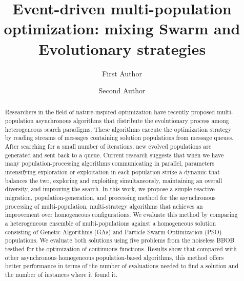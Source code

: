 \documentclass[runningheads]{llncs}
\begin{document}
\title{Event-driven multi-population optimization: mixing Swarm and
  Evolutionary strategies}
\author{First Author \and
Second Author}
%

%
\maketitle              %
%
\begin{abstract}

Researchers in the field of nature-inspired optimization have recently
proposed multi-population asynchronous algorithms that distribute the
evolutionary process among heterogeneous search paradigms. These
algorithms execute the optimization strategy by reading streams of
messages containing solution populations from message queues. After
searching for a small number of iterations, new evolved populations
are generated and sent back to a queue. Current research suggests that
when we have many population-processing algorithms communicating in
parallel, parameters intensifying exploration or exploitation in each
population strike a dynamic that balances the two, exploring and
exploiting simultaneously, maintaining an overall diversity, and
improving the search.  In this work, we propose a simple reactive
migration, population-generation, and processing method for
the asynchronous processing of multi-population, multi-strategy
algorithms that achieves an improvement over homogeneous
configurations. We evaluate this method by comparing a heterogeneous
ensemble of multi-populations against a homogeneous solution
consisting of Genetic Algorithms (GAs) and Particle Swarm Optimization
(PSO) populations. We evaluate both solutions using five problems from
the noiseless BBOB testbed for the optimization of continuous
functions. Results show that compared with other asynchronous
homogeneous population-based algorithms, this method offers better
performance in terms of the number of evaluations needed to find a
solution and the number of instances where it found it.

\end{abstract}
%
%
%
\end{document}
